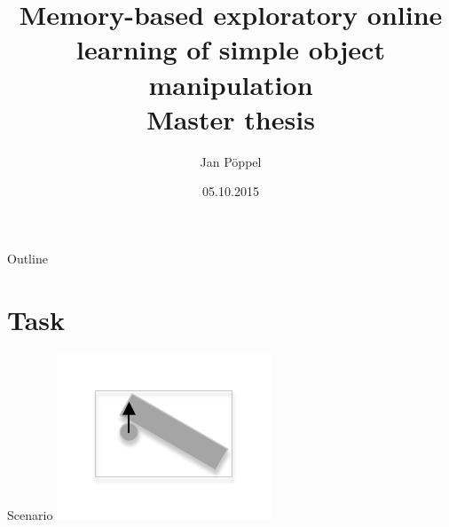 \documentclass{beamer}
\title[]{\textbf{Memory-based exploratory online learning of simple object 
manipulation}\\{\scriptsize Master thesis}}
\author[]{Jan P\"oppel}
\date{05.10.2015}
\begin{document}
\begin{frame}
	\maketitle
\end{frame}

\begin{frame}{Outline}
\tableofcontents
\end{frame}

\section{Task}
\begin{frame}{Scenario}
\includegraphics[width=\textwidth]{Scneario.pdf}
\end{frame}
\end{document}
